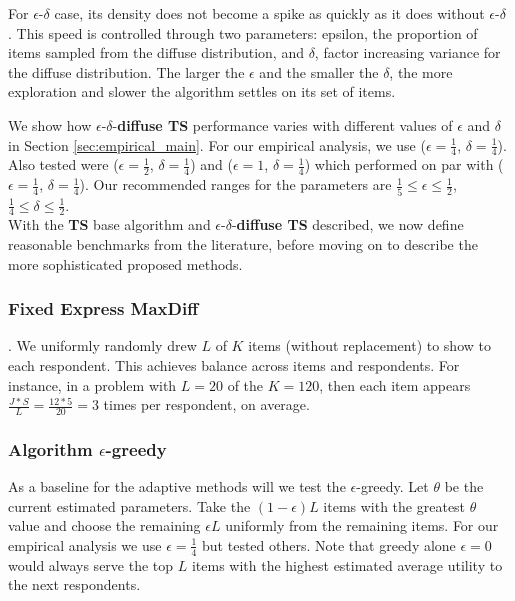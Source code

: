 \documentclass[a4paper,12pt]{article}
\newcommand{\alexander}[1]{\textcolor{blue}{\textbf{(alexander)} #1}}
\newcommand{\eric}[1]{\textcolor{red}{\textbf{(eric)} #1}}
\newcommand{\ts}{\textbf{TS} }
\newcommand{\edts}{$\epsilon$-$\delta$-\textbf{diffuse TS} }
\newcommand{\numperset}{L}
\begin{document}
For $\epsilon$-$\delta$ case, its density does not become a spike as quickly as it does without $\epsilon$-$\delta$ . This speed is controlled through two parameters: epsilon, the proportion of items sampled from the diffuse distribution, and $\delta$, factor increasing variance for the diffuse distribution.  The larger the $\epsilon$ and the smaller the $\delta$, the more exploration and slower the algorithm settles on its set of items. 


We show how \edts performance varies with different values of $\epsilon$ and $\delta$ in Section \ref{sec:empirical_main}.  For our empirical analysis, we use ($\epsilon=\frac{1}{4}$, $\delta=\frac{1}{4}$). Also tested were ($\epsilon=\frac{1}{2}$, $\delta=\frac{1}{4}$) and ($\epsilon=1$, $\delta=\frac{1}{4}$) which performed on par with ($\epsilon=\frac{1}{4}$, $\delta=\frac{1}{4}$). Our recommended ranges for the parameters are $\frac{1}{5}\leq \epsilon \leq \frac{1}{2}$, $\frac{1}{4}\leq \delta \leq \frac{1}{2}$.\\



With the \ts base algorithm and \edts described, we now define reasonable benchmarks from the literature, before moving on to describe the more sophisticated proposed methods. 

\subsubsection{Fixed Express MaxDiff}. We uniformly randomly drew $\numperset$ of $K$ items (without replacement) to show to each respondent.  This achieves balance across items and respondents. For instance, in a problem with $\numperset=20$ of the $K=120$, then each item appears $\frac{J*S}{L} = \frac{12*5}{20} = 3$ times per respondent, on average.

\subsubsection{Algorithm $\epsilon$-greedy}
As a baseline for the adaptive methods will we test the $\epsilon$-greedy. Let $\theta$ be the current estimated parameters. Take the $(1-\epsilon)L$ items with the greatest $\theta$ value and choose the remaining $\epsilon L$ uniformly from the remaining items. For our empirical analysis we use $\epsilon=\frac{1}{4}$ but tested others. Note that greedy alone $\epsilon=0$ would always serve the top $\numperset$ items with the highest estimated average utility to the next respondents.
\end{document}
